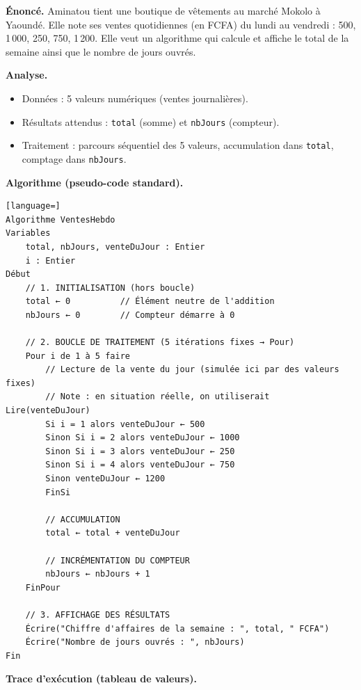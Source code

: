 \documentclass[11pt]{article}
\begin{document}
\begin{exoresolu}
\textbf{Énoncé.} Aminatou tient une boutique de vêtements au marché Mokolo à Yaoundé. Elle note ses ventes quotidiennes (en FCFA) du lundi au vendredi : 500, 1\,000, 250, 750, 1\,200. Elle veut un algorithme qui calcule et affiche le total de la semaine ainsi que le nombre de jours ouvrés.

\tcblower
\textbf{Analyse.}
\begin{itemize}
    \item Données : 5 valeurs numériques (ventes journalières).
    \item Résultats attendus : \texttt{total} (somme) et \texttt{nbJours} (compteur).
    \item Traitement : parcours séquentiel des 5 valeurs, accumulation dans \texttt{total}, comptage dans \texttt{nbJours}.
\end{itemize}

\textbf{Algorithme (pseudo-code standard).}
\begin{lstlisting}[language=]
Algorithme VentesHebdo
Variables
    total, nbJours, venteDuJour : Entier
    i : Entier
Début
    // 1. INITIALISATION (hors boucle)
    total ← 0          // Élément neutre de l'addition
    nbJours ← 0        // Compteur démarre à 0

    // 2. BOUCLE DE TRAITEMENT (5 itérations fixes → Pour)
    Pour i de 1 à 5 faire
        // Lecture de la vente du jour (simulée ici par des valeurs fixes)
        // Note : en situation réelle, on utiliserait Lire(venteDuJour)
        Si i = 1 alors venteDuJour ← 500
        Sinon Si i = 2 alors venteDuJour ← 1000
        Sinon Si i = 3 alors venteDuJour ← 250
        Sinon Si i = 4 alors venteDuJour ← 750
        Sinon venteDuJour ← 1200
        FinSi

        // ACCUMULATION
        total ← total + venteDuJour

        // INCRÉMENTATION DU COMPTEUR
        nbJours ← nbJours + 1
    FinPour

    // 3. AFFICHAGE DES RÉSULTATS
    Écrire("Chiffre d'affaires de la semaine : ", total, " FCFA")
    Écrire("Nombre de jours ouvrés : ", nbJours)
Fin
\end{lstlisting}

\textbf{Trace d'exécution (tableau de valeurs).}


\end{exoresolu}
\end{document}
